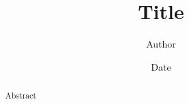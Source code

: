 \documentclass{article}
\title{\textbf{Title}}
\author{Author}
\date{Date}
\begin{document}
\maketitle

\begin{abstract}
  Abstract
\end{abstract}


\printbibliography
\end{document}

